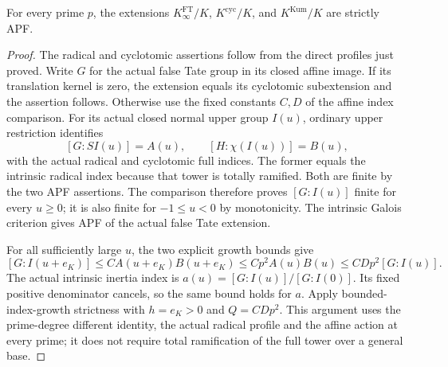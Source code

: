 \begin{theorem}
\label{ft:strict-apf}
\leanok
{}
For every prime $p$, the extensions $K^{\mathrm{FT}}_\infty/K$,
$K^{\mathrm{cyc}}/K$, and $K^{\mathrm{Kum}}/K$ are strictly APF.
\end{theorem}
\begin{proof}
The radical and cyclotomic assertions follow from the direct profiles
just proved. Write $G$ for the actual false Tate group in its closed
affine image. If its translation kernel is zero, the extension
equals its cyclotomic subextension and the assertion follows.
Otherwise use the fixed constants $C,D$ of the affine index
comparison. For its actual closed normal upper group $I(u)$,
ordinary upper restriction identifies
\[
 [G:S I(u)]=A(u),\qquad [H:\chi(I(u))]=B(u),
\]
with the actual radical and cyclotomic full indices. The former
equals the intrinsic radical index because that tower is totally
ramified. Both are finite by the two APF assertions. The comparison
therefore proves $[G:I(u)]$ finite for every $u\geq0$; it is
also finite for $-1\leq u<0$ by monotonicity. The intrinsic Galois
criterion gives APF of the actual false Tate extension.

For all sufficiently large $u$, the two explicit growth bounds give
\[
 [G:I(u+e_K)]\leq C A(u+e_K)B(u+e_K)
 \leq Cp^2 A(u)B(u)\leq CDp^2[G:I(u)].
\]
The actual intrinsic inertia index is
$a(u)=[G:I(u)]/[G:I(0)]$. Its fixed positive denominator cancels,
so the same bound holds for $a$. Apply bounded-index-growth
strictness with $h=e_K>0$ and $Q=CDp^2$.
This argument uses the prime-degree different identity, the actual
radical profile and the affine action at every prime; it does not
require total ramification of the full tower over a general base.
\end{proof}

